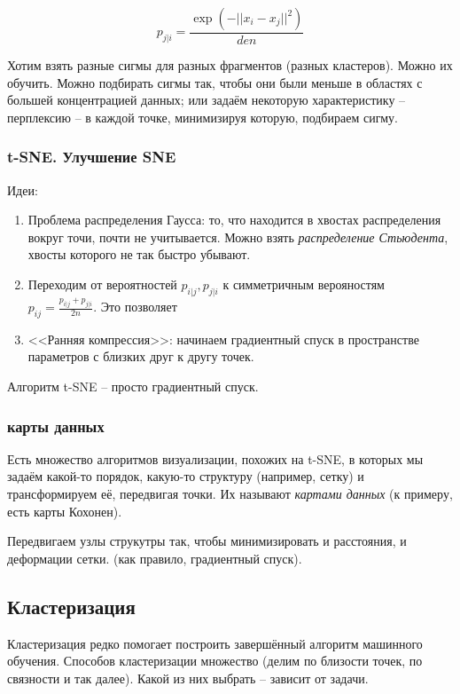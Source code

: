 \documentclass[main.tex]{subfiles}
\begin{document}
$$ p_{j|i} = \frac{\exp(- || x_i - x_j ||^2)}{den} $$ %

Хотим взять разные сигмы для разных фрагментов (разных кластеров).
Можно их обучить.
Можно подбирать сигмы так, чтобы они были меньше в областях с большей концентрацией данных; или задаём некоторую характеристику -- перплексию -- в каждой точке, минимизируя которую, подбираем сигму.

\subsubsection{t-SNE. Улучшение SNE}

Идеи:

\begin{enumerate}[noitemsep]
	\item Проблема распределения Гаусса: то, что находится в хвостах распределения вокруг точи, почти не учитывается.
	Можно взять \emph{распределение Стьюдента}, хвосты которого не так быстро убывают.
	\item Переходим от вероятностей $ p_{i|j}, p_{j|i} $ к симметричным верояностям $ p_{ij} = \frac{p_{i|j} + p_{j|i}}{2n} $.
	Это позволяет 
	\item <<Ранняя компрессия>>: начинаем градиентный спуск в пространстве параметров с близких друг к другу точек.
\end{enumerate}

Алгоритм t-SNE -- просто градиентный спуск.

\subsubsection{карты данных}

Есть множество алгоритмов визуализации, похожих на t-SNE, в которых мы задаём какой-то порядок, какую-то структуру (например, сетку) и трансформируем её, передвигая точки.
Их называют \emph{картами данных} (к примеру, есть карты Кохонен).

Передвигаем узлы струкутры так, чтобы минимизировать и расстояния, и деформации сетки. (как правило, градиентный спуск).

\subsection{Кластеризация}

Кластеризация редко помогает построить завершённый алгоритм машинного обучения.
Способов кластеризации множество (делим по близости точек, по связности и так далее).
Какой из них выбрать -- зависит от задачи.
\end{document}

